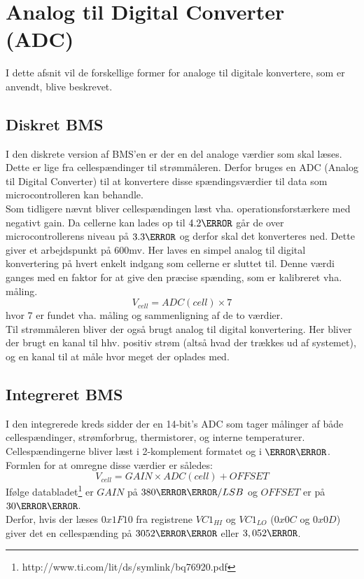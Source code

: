 \section{Analog til Digital Converter (ADC)}
I dette afsnit vil de forskellige former for analoge til digitale konvertere, som er anvendt, blive beskrevet. 

\subsection{Diskret BMS}
I den diskrete version af BMS'en er der en del analoge værdier som skal læses. Dette er lige fra cellespændinger til strømmåleren. Derfor bruges en ADC (Analog til Digital Converter) til at konvertere disse spændingsværdier til data som microcontrolleren kan behandle. \\

Som tidligere nævnt bliver cellespændingen læst vha. operationsforstærkere med negativt gain. Da cellerne kan lades op til $4.2\volt$ går de over microcontrollerens niveau på $3.3\volt$ og derfor skal det konverteres ned.  Dette giver et arbejdspunkt på 600mv. Her laves en simpel analog til digital konvertering på hvert enkelt indgang som cellerne er sluttet til. Denne værdi ganges med en faktor for at give den præcise spænding, som er kalibreret vha. måling. 
\begin {equation}
V_{cell} = ADC(cell) \times 7
\end {equation}
hvor 7 er fundet vha. måling og sammenligning af de to værdier. \\

Til strømmåleren bliver der også brugt analog til digital konvertering. Her bliver der brugt en kanal til hhv. positiv strøm (altså hvad der trækkes ud af systemet), og en kanal til at måle hvor meget der oplades med. 

\subsection{Integreret BMS}
I den integrerede kreds sidder der en 14-bit's ADC som tager målinger af både cellespændinger, strømforbrug, thermistorer, og interne temperaturer. Cellespændingerne bliver læst i 2-komplement formatet og i $\milli\volt$. Formlen for at omregne disse værdier er således: 
\begin {equation} 
V_{cell} = GAIN \times ADC(cell) + OFFSET
\end {equation}
Ifølge databladet\footnote{http://www.ti.com/lit/ds/symlink/bq76920.pdf} er $GAIN$ på $380\micro\volt/LSB$ og $OFFSET$ er på $30\milli\volt$. \\

Derfor, hvis der læses $0x1F10$ fra registrene $VC1_{HI}$ og $VC1_{LO}$ ($0x0C$ og $0x0D$) giver det en cellespænding på $3052\milli\volt$ eller $3,052\volt$.